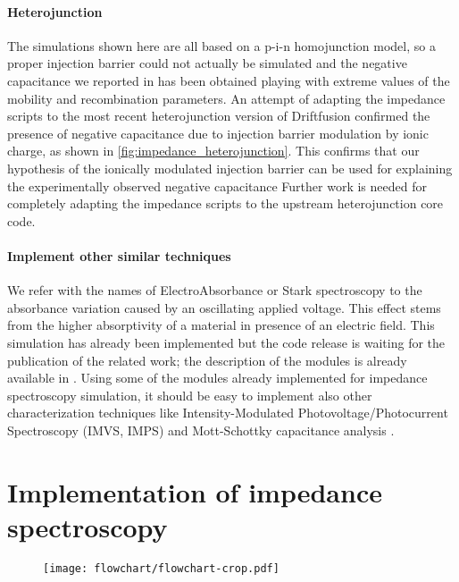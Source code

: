 \paragraph{Heterojunction}
The simulations shown here are all based on a p-i-n homojunction model, so a proper injection barrier could not actually be simulated and the negative capacitance we reported in  has been obtained playing with extreme values of the mobility and recombination parameters.
An attempt of adapting the impedance scripts to the most recent heterojunction version of Driftfusion confirmed the presence of negative capacitance due to injection barrier modulation by ionic charge, as shown in \cref{fig:impedance_heterojunction}.
This confirms that our hypothesis of the ionically modulated injection barrier can be used for explaining the experimentally observed negative capacitance \cite{Guerrero2016,Moia2019,Ghahremanirad2017,Sanchez2014}
Further work is needed for completely adapting the impedance scripts to the upstream heterojunction core code.

\paragraph{Implement other similar techniques}
We refer with the names of ElectroAbsorbance or Stark spectroscopy to the absorbance variation caused by an oscillating applied voltage.
This effect stems from the higher absorptivity of a material in presence of an electric field.
This simulation has already been implemented but the code release is waiting for the publication of the related work; the description of the modules is already available in .
Using some of the modules already implemented for impedance spectroscopy simulation, it should be easy to implement also other characterization techniques like Intensity-Modulated Photovoltage/Photocurrent Spectroscopy (IMVS, IMPS) \cite{Pockett2015,Guillen2014} and Mott-Schottky capacitance analysis \cite{Almora2016}.



\section{Implementation of impedance spectroscopy}

	\begin{figure}%
		\centering
		\texttt{[image: flowchart/flowchart-crop.pdf]}
		\label{fig:impedance_flowchart}
	\end{figure}

